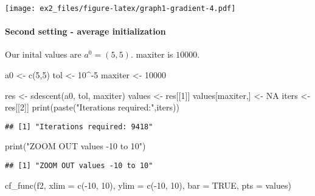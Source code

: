 \documentclass[
]{article}
\newenvironment{Shaded}{\begin{snugshade}}{\end{snugshade}}
\newcommand{\AttributeTok}[1]{\textcolor[rgb]{0.77,0.63,0.00}{#1}}
\newcommand{\ConstantTok}[1]{\textcolor[rgb]{0.00,0.00,0.00}{#1}}
\newcommand{\DecValTok}[1]{\textcolor[rgb]{0.00,0.00,0.81}{#1}}
\newcommand{\FunctionTok}[1]{\textcolor[rgb]{0.00,0.00,0.00}{#1}}
\newcommand{\NormalTok}[1]{#1}
\newcommand{\OtherTok}[1]{\textcolor[rgb]{0.56,0.35,0.01}{#1}}
\newcommand{\SpecialCharTok}[1]{\textcolor[rgb]{0.00,0.00,0.00}{#1}}
\newcommand{\StringTok}[1]{\textcolor[rgb]{0.31,0.60,0.02}{#1}}
\begin{document}
\texttt{[image: ex2\_files/figure-latex/graph1-gradient-4.pdf]}

\hypertarget{second-setting---average-initialization}{%
\paragraph{Second setting - average
initialization}\label{second-setting---average-initialization}}

Our inital values are \(a^{0}=(5, 5)\). maxiter is \(10000\).

\begin{Shaded}
\begin{Highlighting}[]
\NormalTok{a0 }\OtherTok{\textless{}{-}} \FunctionTok{c}\NormalTok{(}\DecValTok{5}\NormalTok{,}\DecValTok{5}\NormalTok{)}
\NormalTok{tol }\OtherTok{\textless{}{-}} \DecValTok{10}\SpecialCharTok{\^{}{-}}\DecValTok{5}
\NormalTok{maxiter }\OtherTok{\textless{}{-}} \DecValTok{10000}

\NormalTok{res }\OtherTok{\textless{}{-}} \FunctionTok{sdescent}\NormalTok{(a0, tol, maxiter)}
\NormalTok{values }\OtherTok{\textless{}{-}}\NormalTok{ res[[}\DecValTok{1}\NormalTok{]]}
\NormalTok{values[maxiter,] }\OtherTok{\textless{}{-}} \ConstantTok{NA}
\NormalTok{iters }\OtherTok{\textless{}{-}}\NormalTok{ res[[}\DecValTok{2}\NormalTok{]]}
\FunctionTok{print}\NormalTok{(}\FunctionTok{paste}\NormalTok{(}\StringTok{"Iterations required:"}\NormalTok{,iters))}
\end{Highlighting}
\end{Shaded}

\begin{verbatim}
## [1] "Iterations required: 9418"
\end{verbatim}

\begin{Shaded}
\begin{Highlighting}[]
\FunctionTok{print}\NormalTok{(}\StringTok{"ZOOM OUT values {-}10 to 10"}\NormalTok{)}
\end{Highlighting}
\end{Shaded}

\begin{verbatim}
## [1] "ZOOM OUT values -10 to 10"
\end{verbatim}

\begin{Shaded}
\begin{Highlighting}[]
\FunctionTok{cf\_func}\NormalTok{(f2, }\AttributeTok{xlim =} \FunctionTok{c}\NormalTok{(}\SpecialCharTok{{-}}\DecValTok{10}\NormalTok{, }\DecValTok{10}\NormalTok{), }\AttributeTok{ylim =} \FunctionTok{c}\NormalTok{(}\SpecialCharTok{{-}}\DecValTok{10}\NormalTok{, }\DecValTok{10}\NormalTok{), }\AttributeTok{bar =} \ConstantTok{TRUE}\NormalTok{, }\AttributeTok{pts =}\NormalTok{ values)}
\end{Highlighting}
\end{Shaded}
\end{document}
